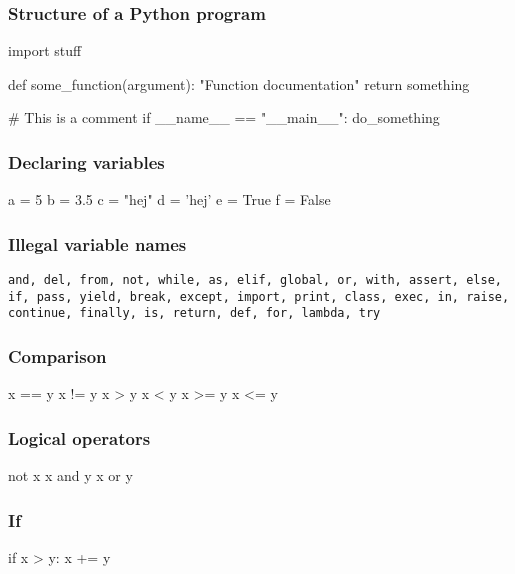 
\begin{frame}[fragile]
  \frametitle{Structure of a Python program}

\begin{python}
import stuff

def some_function(argument):
    "Function documentation"
    return something

# This is a comment
if __name__ == "__main__":
    do_something
\end{python}

\end{frame}

\begin{frame}[fragile]
  \frametitle{Declaring variables}

\begin{python}
a = 5
b = 3.5
c = "hej"
d = 'hej'
e = True
f = False
\end{python}

\end{frame}

\begin{frame}[fragile]
  \frametitle{Illegal variable names}

\texttt{and, del, from, not, while, as, elif, global, or, with,
  assert, else, if, pass, yield, break, except, import, print, class,
  exec, in, raise, continue, finally, is, return, def, for, lambda, try}

\end{frame}

\begin{frame}[fragile]
  \frametitle{Comparison}

\begin{python}
x == y
x != y
x > y
x < y
x >= y
x <= y
\end{python}

\end{frame}

\begin{frame}[fragile]
  \frametitle{Logical operators}

\begin{python}
not x
x and y
x or y
\end{python}

\end{frame}

\begin{frame}[fragile]
  \frametitle{If}

\begin{python}
if x > y:
    x += y
\end{python}

\end{frame}

